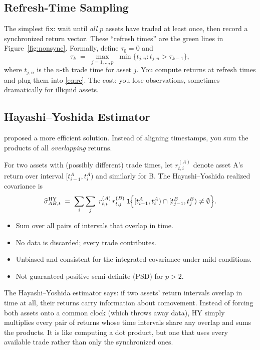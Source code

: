 \subsection{Refresh-Time Sampling}

The simplest fix: wait until \emph{all} $p$ assets have traded at least once,
then record a synchronized return vector. These ``refresh times'' are the green
lines in Figure~\ref{fig:nonsync}. Formally, define $\tau_0 = 0$ and
\[
  \tau_k \;=\; \max_{j=1,\ldots,p}\; \min\bigl\{t_{j,n} : t_{j,n} > \tau_{k-1}\bigr\},
\]
where $t_{j,n}$ is the $n$-th trade time for asset $j$. You compute returns at
refresh times and plug them into \eqref{eq:rc}. The cost: you lose observations,
sometimes dramatically for illiquid assets.

\subsection{Hayashi--Yoshida Estimator}

\citet{HayashiYoshida2005} proposed a more efficient solution. Instead of aligning
timestamps, you sum the products of all \emph{overlapping} returns.

\begin{definition}
For two assets with (possibly different) trade times, let $r_{t,i}^{(A)}$ denote
asset A's return over interval $[t_{i-1}^A, t_i^A)$ and similarly for B. The
Hayashi--Yoshida realized covariance is
\begin{equation}\label{eq:hy}
  \widehat{\sigma}_{AB,t}^{\mathrm{HY}}
  \;=\; \sum_{i}\sum_{j}\; r_{t,i}^{(A)}\, r_{t,j}^{(B)}\;
  \mathbf{1}\!\Bigl\{
    [t_{i-1}^A, t_i^A) \cap [t_{j-1}^B, t_j^B) \neq \emptyset
  \Bigr\}.
\end{equation}
\begin{itemize}[nosep]
  \item Sum over all pairs of intervals that overlap in time.
  \item No data is discarded; every trade contributes.
  \item Unbiased and consistent for the integrated covariance under mild conditions.
  \item Not guaranteed positive semi-definite (PSD) for $p > 2$.
\end{itemize}
\end{definition}

\begin{intuition}
The Hayashi--Yoshida estimator says: if two assets' return intervals overlap in
time at all, their returns carry information about comovement. Instead of
forcing both assets onto a common clock (which throws away data), HY simply
multiplies every pair of returns whose time intervals share any overlap and sums
the products. It is like computing a dot product, but one that uses every
available trade rather than only the synchronized ones.
\end{intuition}

